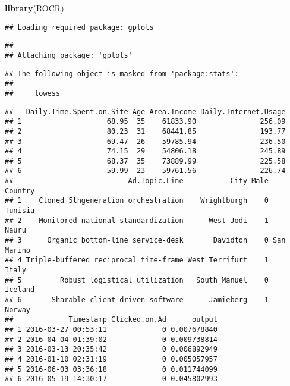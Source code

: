 \documentclass[
]{article}
\newenvironment{Shaded}{\begin{snugshade}}{\end{snugshade}}
\newcommand{\DataTypeTok}[1]{\textcolor[rgb]{0.13,0.29,0.53}{#1}}
\newcommand{\KeywordTok}[1]{\textcolor[rgb]{0.13,0.29,0.53}{\textbf{#1}}}
\newcommand{\NormalTok}[1]{#1}
\newcommand{\OperatorTok}[1]{\textcolor[rgb]{0.81,0.36,0.00}{\textbf{#1}}}
\newcommand{\StringTok}[1]{\textcolor[rgb]{0.31,0.60,0.02}{#1}}
\begin{document}
\begin{Shaded}
\begin{Highlighting}[]
\KeywordTok{library}\NormalTok{(ROCR)}
\end{Highlighting}
\end{Shaded}

\begin{verbatim}
## Loading required package: gplots
\end{verbatim}

\begin{verbatim}
## 
## Attaching package: 'gplots'
\end{verbatim}

\begin{verbatim}
## The following object is masked from 'package:stats':
## 
##     lowess
\end{verbatim}

\begin{Shaded}
\end{Shaded}

\begin{verbatim}
##   Daily.Time.Spent.on.Site Age Area.Income Daily.Internet.Usage
## 1                    68.95  35    61833.90               256.09
## 2                    80.23  31    68441.85               193.77
## 3                    69.47  26    59785.94               236.50
## 4                    74.15  29    54806.18               245.89
## 5                    68.37  35    73889.99               225.58
## 6                    59.99  23    59761.56               226.74
##                           Ad.Topic.Line           City Male    Country
## 1    Cloned 5thgeneration orchestration    Wrightburgh    0    Tunisia
## 2    Monitored national standardization      West Jodi    1      Nauru
## 3      Organic bottom-line service-desk       Davidton    0 San Marino
## 4 Triple-buffered reciprocal time-frame West Terrifurt    1      Italy
## 5         Robust logistical utilization   South Manuel    0    Iceland
## 6       Sharable client-driven software      Jamieberg    1     Norway
##             Timestamp Clicked.on.Ad      output
## 1 2016-03-27 00:53:11             0 0.007678840
## 2 2016-04-04 01:39:02             0 0.009738814
## 3 2016-03-13 20:35:42             0 0.006892949
## 4 2016-01-10 02:31:19             0 0.005057957
## 5 2016-06-03 03:36:18             0 0.011744099
## 6 2016-05-19 14:30:17             0 0.045802993
\end{verbatim}
\end{document}
